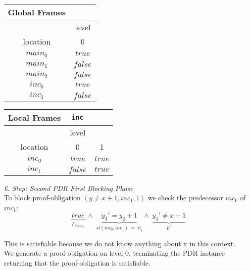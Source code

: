 \documentclass{article}
\newcommand\mycom[1]{}
\newcommand\mycom[1]{#1}
\newcommand{\jw}[1]{\mycom{\todo[color=blue!40,inline]{\small JW: #1}}}
\begin{document}
		\begin{minipage}{.5\textwidth}
		\setlength\tabcolsep{0.35em}
		\begin{center}
			\begin{tabu}{cc}
				Global Frames \\
				\toprule
				& level \\
				\cmidrule(lr){2-2}
				location & 0 \\
				$main_0$ & $true$ \\
				$main_1$ & $false$ \\
				$main_2$ & $false$ \\
				$inc_0$ & $true$ \\
				$inc_1$ & $false$\\
				\bottomrule
			\end{tabu}
		\end{center}
	\end{minipage}
	\hfill
	\begin{minipage}{.4\textwidth}
		\setlength\tabcolsep{0.35em}
		\begin{center}
			\begin{tabu}{ccc}
				Local Frames & \texttt{inc} \\
				\toprule
				& level \\
				\cmidrule(lr){2-2}
				location & 0 & 1 \\
				\cmidrule{1-3}
				$inc_0$ & $true$ & $true$ \\
				$inc_1$ & $false$ & $true$ \\
				\bottomrule
			\end{tabu}
		\end{center}	
	\end{minipage}
	
	\vspace*{1em}
	
	
	\textsl{6. Step: Second PDR First Blocking Phase} \\
	To block proof-obligation $(y \neq x + 1, inc_1, 1)$ we check the predecessor $inc_0$ of $inc_1$: \\
		\begin{equation*}
		\underbrace{true}_{F_{0, inc_0}}\; \land \; \underbrace{y_3' = y_2 + 1}_{st(inc_0, inc_1)\; = \; \psi_1} \land \; \underbrace{y_3' \neq x + 1}_{p'}
		\end{equation*}
		\jw{In dem fall dass eine variable weder in In oder Out vorkommt ist sie Aux, oder einfach eine freie Variable? Hier x}
		This is satisfiable because we do not know anything about x in this context. \\
		We generate a proof-obligation on level 0, terminating the PDR instance returning that the proof-obligation is satisfiable. \\ \\
	
\end{document}
